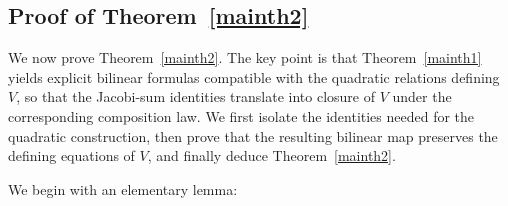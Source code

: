 \documentclass[a4paper, 11pt]{amsart}
\theoremstyle{plain}
\theoremstyle{definition}
\numberwithin{equation}{section}
\begin{document}
\subsection{Proof of Theorem~\ref{mainth2}}\label{S4-2}

We now prove Theorem~\ref{mainth2}. 
The key point is that Theorem~\ref{mainth1} yields explicit bilinear formulas compatible with the quadratic relations defining $V$, so that the Jacobi-sum identities translate into closure of $V$ under the corresponding composition law. 
We first isolate the identities needed for the quadratic construction, then prove that the resulting bilinear map preserves the defining equations of $V$, and finally deduce Theorem~\ref{mainth2}.

We begin with an elementary lemma:
\end{document}
